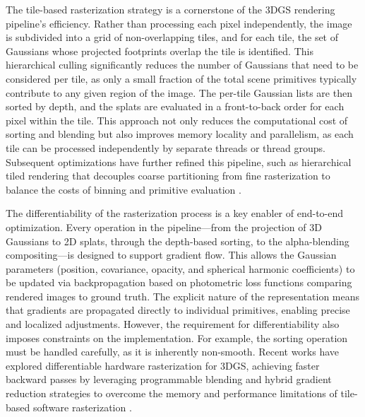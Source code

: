 \documentclass[11pt]{article}
\begin{document}
The tile-based rasterization strategy is a cornerstone of the 3DGS rendering pipeline's efficiency. Rather than processing each pixel independently, the image is subdivided into a grid of non-overlapping tiles, and for each tile, the set of Gaussians whose projected footprints overlap the tile is identified. This hierarchical culling significantly reduces the number of Gaussians that need to be considered per tile, as only a small fraction of the total scene primitives typically contribute to any given region of the image. The per-tile Gaussian lists are then sorted by depth, and the splats are evaluated in a front-to-back order for each pixel within the tile. This approach not only reduces the computational cost of sorting and blending but also improves memory locality and parallelism, as each tile can be processed independently by separate threads or thread groups. Subsequent optimizations have further refined this pipeline, such as hierarchical tiled rendering that decouples coarse partitioning from fine rasterization to balance the costs of binning and primitive evaluation \cite{ref26}.

The differentiability of the rasterization process is a key enabler of end-to-end optimization. Every operation in the pipeline---from the projection of 3D Gaussians to 2D splats, through the depth-based sorting, to the alpha-blending compositing---is designed to support gradient flow. This allows the Gaussian parameters (position, covariance, opacity, and spherical harmonic coefficients) to be updated via backpropagation based on photometric loss functions comparing rendered images to ground truth. The explicit nature of the representation means that gradients are propagated directly to individual primitives, enabling precise and localized adjustments. However, the requirement for differentiability also imposes constraints on the implementation. For example, the sorting operation must be handled carefully, as it is inherently non-smooth. Recent works have explored differentiable hardware rasterization for 3DGS, achieving faster backward passes by leveraging programmable blending and hybrid gradient reduction strategies to overcome the memory and performance limitations of tile-based software rasterization \cite{ref27}.
\end{document}
